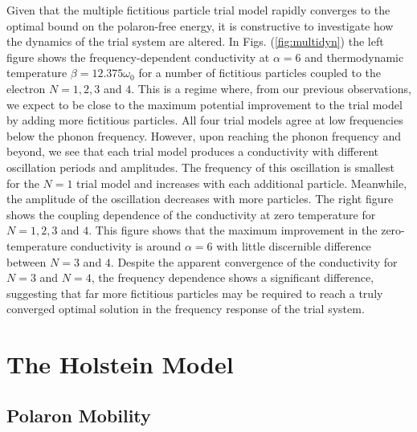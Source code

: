 Given that the multiple fictitious particle trial model rapidly converges to the optimal bound on the polaron-free energy, it is constructive to investigate how the dynamics of the trial system are altered. In Figs. (\ref{fig:multidyn}) the left figure shows the frequency-dependent conductivity at $\alpha = 6$ and thermodynamic temperature $\beta = 12.375 \omega_0$ for a number of fictitious particles coupled to the electron $N = 1, 2, 3$ and $4$. This is a regime where, from our previous observations, we expect to be close to the maximum potential improvement to the trial model by adding more fictitious particles. All four trial models agree at low frequencies below the phonon frequency. However, upon reaching the phonon frequency and beyond, we see that each trial model produces a conductivity with different oscillation periods and amplitudes. The frequency of this oscillation is smallest for the $N=1$ trial model and increases with each additional particle. Meanwhile, the amplitude of the oscillation decreases with more particles. The right figure shows the coupling dependence of the conductivity at zero temperature for $N=1, 2,3$ and $4$. This figure shows that the maximum improvement in the zero-temperature conductivity is around $\alpha = 6$ with little discernible difference between $N=3$ and $4$. Despite the apparent convergence of the conductivity for $N=3$ and $N=4$, the frequency dependence shows a significant difference, suggesting that far more fictitious particles may be required to reach a truly converged optimal solution in the frequency response of the trial system.

\section{The Holstein Model}

\subsection{Polaron Mobility}

